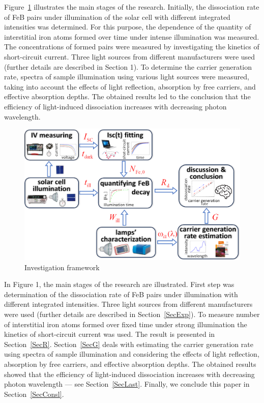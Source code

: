 \documentclass{WileyMSP-template}
\begin{document}
Figure~\ref{fig1} illustrates the main stages of the research. Initially, the dissociation rate of FeB pairs under illumination of the solar cell with different integrated intensities was determined. For this purpose, the dependence of the quantity of interstitial iron atoms formed over time under intense illumination was measured. The concentrations of formed pairs were measured by investigating the kinetics of short-circuit current. Three light sources from different manufacturers were used (further details are described in Section 1).
To determine the carrier generation rate, spectra of sample illumination using various light sources were measured, taking into account the effects of light reflection, absorption by free carriers, and effective absorption depths. The obtained results led to the conclusion that the efficiency of light-induced dissociation increases with decreasing photon wavelength.

\begin{figure}
\centering
  \includegraphics[width=0.5\linewidth]{Fig1.png}
  \caption{Investigation framework}
  \label{fig1}
\end{figure}

In Figure 1, the main stages of the research are illustrated.
First step was determination of the dissociation rate of FeB pairs under illumination with different integrated intensities. 
Three light sources from different manufacturers were used (further details are described in Section~\ref{SecExp}).
To measure number of interstitial iron atoms formed over fixed time under strong illumination the kinetics of short-circuit current was used.
The result is presented in Section~\ref{SecR}.
Section~\ref{SecG} deals with estimating the carrier generation rate using spectra of sample illumination and considering the effects of light reflection, absorption by free carriers, and effective absorption depths.
The obtained results showed that the efficiency of light-induced dissociation increases with decreasing photon wavelength --- see Section~\ref{SecLast}.
Finally, we conclude this paper in Section~\ref{SecConsl}.
\end{document}
